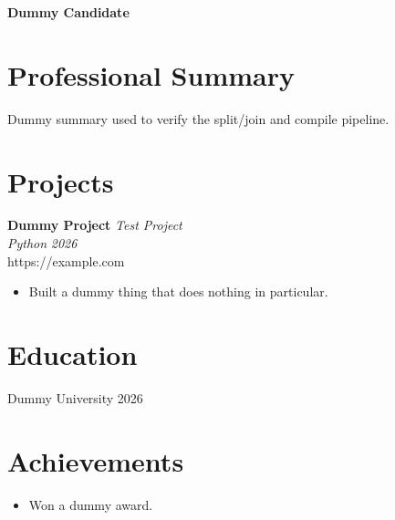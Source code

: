 \documentclass[10pt,letterpaper]{article}
\newcommand{\roleEntry}[5]{%
  \textbf{#1} \hfill \textit{#2} \\
  \textit{#3} \hfill \textit{#4} \\
  #5
}
\newcommand{\resumeItem}[1]{\item #1}
\newcommand{\achieveItem}[1]{\item #1}
\begin{document}
\begin{center}
  {\LARGE \textbf{Dummy Candidate}}
\end{center}

\section{Professional Summary}
Dummy summary used to verify the split/join and compile pipeline.

\section{Projects}
\roleEntry{Dummy Project}{Test Project}{Python}{2026}{https://example.com}
\begin{itemize}
\resumeItem{Built a dummy thing that does nothing in particular.}
\end{itemize}

\section{Education}
Dummy University \hfill 2026

\section{Achievements}
\begin{itemize}
\achieveItem{Won a dummy award.}
\end{itemize}
\end{document}
